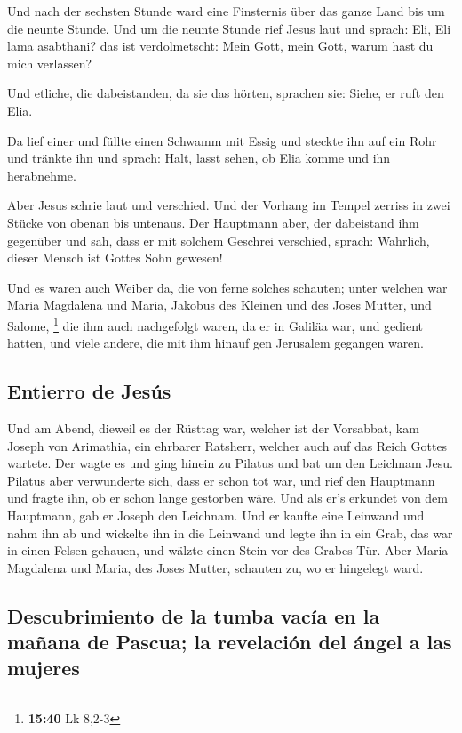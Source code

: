  Und nach der sechsten Stunde ward eine Finsternis über
das ganze Land bis um die neunte Stunde.  Und um die
neunte Stunde rief Jesus laut und sprach: Eli, Eli lama asabthani? das
ist verdolmetscht: Mein Gott, mein Gott, warum hast du mich verlassen?

 Und etliche, die dabeistanden, da sie das hörten,
sprachen sie: Siehe, er ruft den Elia.

 Da lief einer und füllte einen Schwamm mit Essig und
steckte ihn auf ein Rohr und tränkte ihn und sprach: Halt, lasst sehen,
ob Elia komme und ihn herabnehme.

 Aber Jesus schrie laut und verschied. 
Und der Vorhang im Tempel zerriss in zwei Stücke von obenan bis
untenaus.  Der Hauptmann aber, der dabeistand ihm
gegenüber und sah, dass er mit solchem Geschrei verschied, sprach:
Wahrlich, dieser Mensch ist Gottes Sohn gewesen!

 Und es waren auch Weiber da, die von ferne solches
schauten; unter welchen war Maria Magdalena und Maria, Jakobus des
Kleinen und des Joses Mutter, und Salome, \footnote{\textbf{15:40} Lk
  8,2-3}  die ihm auch nachgefolgt waren, da er in
Galiläa war, und gedient hatten, und viele andere, die mit ihm hinauf
gen Jerusalem gegangen waren.

\hypertarget{entierro-de-jesuxfas}{%
\subsection{Entierro de Jesús}\label{entierro-de-jesuxfas}}

 Und am Abend, dieweil es der Rüsttag war, welcher ist
der Vorsabbat,  kam Joseph von Arimathia, ein ehrbarer
Ratsherr, welcher auch auf das Reich Gottes wartete. Der wagte es und
ging hinein zu Pilatus und bat um den Leichnam Jesu. 
Pilatus aber verwunderte sich, dass er schon tot war, und rief den
Hauptmann und fragte ihn, ob er schon lange gestorben wäre.
 Und als er's erkundet von dem Hauptmann, gab er Joseph
den Leichnam.  Und er kaufte eine Leinwand und nahm ihn
ab und wickelte ihn in die Leinwand und legte ihn in ein Grab, das war
in einen Felsen gehauen, und wälzte einen Stein vor des Grabes Tür.
 Aber Maria Magdalena und Maria, des Joses Mutter,
schauten zu, wo er hingelegt ward.

\hypertarget{descubrimiento-de-la-tumba-vacuxeda-en-la-mauxf1ana-de-pascua-la-revelaciuxf3n-del-uxe1ngel-a-las-mujeres}{%
\subsection{Descubrimiento de la tumba vacía en la mañana de Pascua; la
revelación del ángel a las
mujeres}\label{descubrimiento-de-la-tumba-vacuxeda-en-la-mauxf1ana-de-pascua-la-revelaciuxf3n-del-uxe1ngel-a-las-mujeres}}

